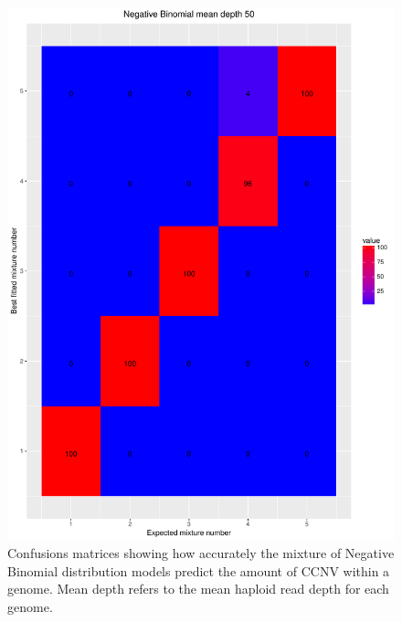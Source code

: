 \documentclass[11pt]{article}
\begin{document}
\begin{figure}[H]
\begin{center}
\includegraphics[scale=0.27]{../Results/Second_Analysis/Negative_Binomial_Confusion_Matrix_50.pdf}
\end{center}
\caption{Confusions matrices showing how accurately the mixture of Negative Binomial distribution models predict the amount of CCNV within a genome. Mean depth refers to the mean haploid read depth for each genome.}
\end{figure}
\end{document}
